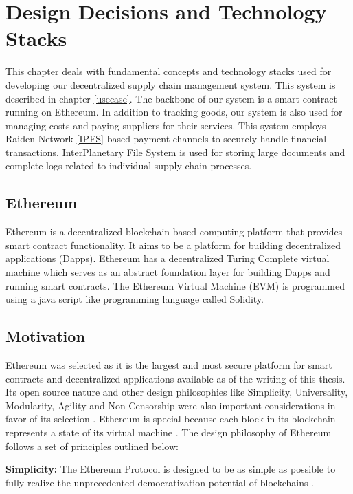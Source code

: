 \section{Design Decisions and Technology Stacks} \label{TS} 
This chapter deals with fundamental concepts and technology stacks used for developing our decentralized supply chain management system. This system is described in chapter \ref{usecase}. The backbone of our system is a smart contract running on Ethereum. In addition to tracking goods, our system is also used for managing costs and paying suppliers for their services. This system employs Raiden Network \ref{IPFS} based payment channels to securely handle financial transactions. InterPlanetary File System is used for storing large documents and complete logs related to individual supply chain processes. 
 
\vspace{0.5cm}
\subsection{Ethereum}\label{eth}
Ethereum is a decentralized blockchain based computing platform that provides smart contract functionality. It aims to be a platform for building decentralized applications (Dapps). Ethereum has a decentralized Turing Complete virtual machine which serves as an abstract foundation layer for building Dapps and running smart contracts. The Ethereum Virtual Machine (EVM) is programmed using a java script like programming language called Solidity.
\subsection*{Motivation}
Ethereum was selected as it is the largest and most secure platform for smart contracts and decentralized applications available as of the writing of this thesis. Its open source nature and other design philosophies like Simplicity, Universality, Modularity, Agility and Non-Censorship were also important considerations in favor of its selection \cite{eth:001}. Ethereum is special because each block in its blockchain represents a state of its virtual machine \cite{eth:001}. The design philosophy of Ethereum follows a set of principles outlined below:

\textbf{Simplicity:} The Ethereum Protocol is designed to be as simple as possible to fully realize the unprecedented democratization potential of blockchains \cite{eth:001}. 

